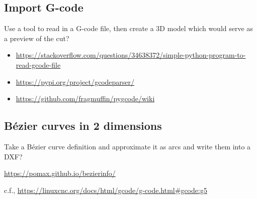\documentclass{ltxdoc}
\begin{document}
\subsection{Import G-code}

Use a tool to read in a G-code file, then create a 3D model which would serve as a preview of the cut?

\begin{itemize}
\item \url{https://stackoverflow.com/questions/34638372/simple-python-program-to-read-gcode-file}
\item \url{https://pypi.org/project/gcodeparser/}
\item \url{https://github.com/fragmuffin/pygcode/wiki}
\end{itemize} 
 
\subsection{Bézier curves in 2 dimensions}

Take a Bézier curve definition and approximate it as arcs and write them into a DXF?

\url{https://pomax.github.io/bezierinfo/}

c.f., \url{https://linuxcnc.org/docs/html/gcode/g-code.html#gcode:g5}

%
%
%
%
%
%
%
%
\end{document}
